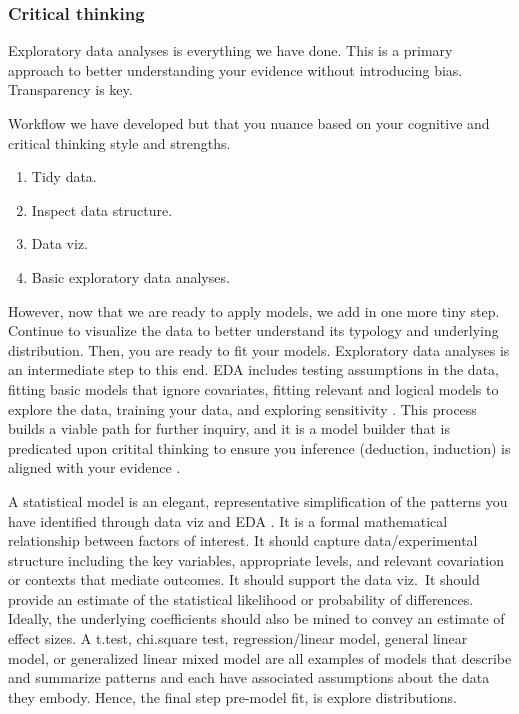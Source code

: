 \documentclass[
]{book}
\providecommand{\tightlist}{%
  \setlength{\itemsep}{0pt}\setlength{\parskip}{0pt}}
\begin{document}
\hypertarget{critical-thinking-3}{%
\subsubsection*{Critical thinking}\label{critical-thinking-3}}

Exploratory data analyses is everything we have done. This is a primary approach to better understanding your evidence without introducing bias. Transparency is key.

Workflow we have developed but that you nuance based on your cognitive and critical thinking style and strengths.

\begin{enumerate}
\def\labelenumi{\alph{enumi}.}
\tightlist
\item
  Tidy data.\\
\item
  Inspect data structure.\\
\item
  Data viz.\\
\item
  Basic exploratory data analyses.
\end{enumerate}

However, now that we are ready to apply models, we add in one more tiny step. Continue to visualize the data to better understand its typology and underlying distribution. Then, you are ready to fit your models. Exploratory data analyses is an intermediate step to this end. EDA includes testing assumptions in the data, fitting basic models that ignore covariates, fitting relevant and logical models to explore the data, training your data, and exploring sensitivity \citep{RN1755}. This process builds a viable path for further inquiry, and it is a model builder that is predicated upon critital thinking to ensure you inference (deduction, induction) is aligned with your evidence \citep{RN6096}.

A statistical model is an elegant, representative simplification of the patterns you have identified through data viz and EDA \citep{RN6911}. It is a formal mathematical relationship between factors of interest. It should capture data/experimental structure including the key variables, appropriate levels, and relevant covariation or contexts that mediate outcomes. It should support the data viz.~It should provide an estimate of the statistical likelihood or probability of differences. Ideally, the underlying coefficients should also be mined to convey an estimate of effect sizes. A t.test, chi.square test, regression/linear model, general linear model, or generalized linear mixed model are all examples of models that describe and summarize patterns and each have associated assumptions about the data they embody. Hence, the final step pre-model fit, is explore distributions.
\end{document}
